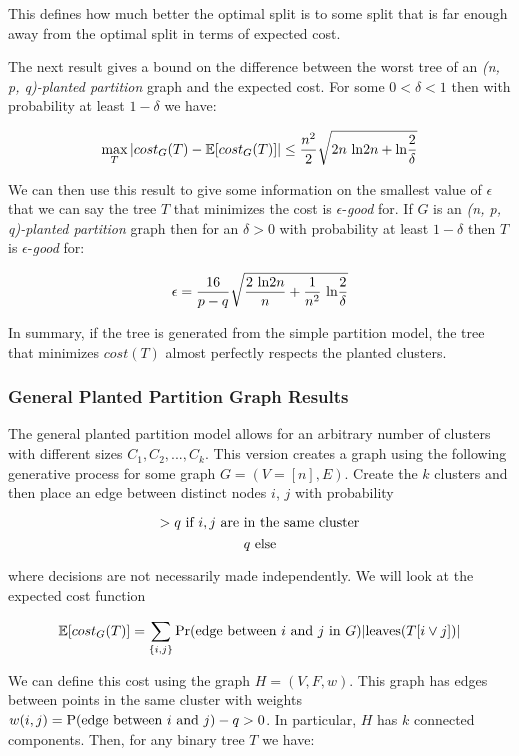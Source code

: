 \documentclass{article}
\begin{document}
This defines how much better the optimal split is to some split that is far enough away from the optimal split in terms of expected cost. 

The next result gives a bound on the difference between the worst tree of an \textit{(n, p, q)-planted partition} graph and the expected cost. For some $0 < \delta < 1$ then with probability at least $1 - \delta$ we have:

$$\max_T|cost_G(T) - \mathbb{E}[cost_G(T)]| \leq \frac{n^2}{2} \sqrt{2n\hbox{ ln}2n + \hbox{ln} \frac{2}{\delta}}$$

We can then use this result to give some information on the smallest value of $\epsilon$ that we can say the tree $T$ that minimizes the cost is $\epsilon$-\textit{good} for. If $G$ is an \textit{(n, p, q)-planted partition} graph then for an $\delta > 0$ with probability at least $1 - \delta$ then $T$ is $\epsilon$-\textit{good} for:

$$\epsilon = \frac{16}{p - q}\sqrt{\frac{2 \hbox{ ln} 2n}{n} + \frac{1}{n^2}\hbox{ ln}\frac{2}{\delta}}$$

In summary, if the tree is generated from the simple partition model, the tree that minimizes $cost(T)$ almost perfectly respects the planted clusters. 

\subsubsection{General Planted Partition Graph Results}

The general planted partition model allows for an arbitrary number of clusters with different sizes $C_1, C_2, ..., C_k$. This version creates a graph using the following generative process for some graph $G = (V = [n], E)$. Create the $k$ clusters and then place an edge between distinct nodes $i$, $j$ with probability

$$ > q \hbox{ if } i, j \hbox{ are in the same cluster}$$
$$q \hbox{ else}$$

where decisions are not necessarily made independently. We will look at the expected cost function 

$$\mathbb{E}[cost_G(T)] = \sum_{\{i, j\}} \hbox{Pr(edge between }  i \hbox{ and } j \hbox{ in } G)  |\hbox{leaves}(T[i \vee j])|$$

We can define this cost using the graph $H = (V, F, w)$. This graph has edges between points in the same cluster with weights $w(i, j) = \hbox{P(edge between }i\hbox{ and }j) - q > 0$. In particular, $H$ has $k$ connected components. Then, for any binary tree $T$ we have:
\end{document}

